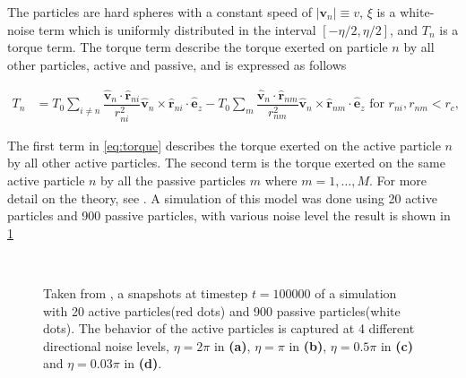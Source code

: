 The particles are hard spheres with a constant speed of $|\bm{v}_n|\equiv v$, $\xi$ is a white-noise 
term which is uniformly distributed in the interval $\left[-\eta/2, \eta/2\right]$, and $T_n$ is a 
torque term. The torque term describe the torque exerted on particle $n$ by all other particles, active 
and passive, and is expressed as follows

\begin{align}
    T_n &=  T_0\sum_{i\neq n}\dfrac{\bm{\hat{v}}_n\cdot\bm{\hat{r}}_{ni}}{r^2_{ni}}
            \bm{\hat{v}}_n\times\bm{\hat{r}}_{ni}\cdot\bm{\hat{e}}_z - 
            T_0\sum_{m}\dfrac{\bm{\hat{v}}_n\cdot\bm{\hat{r}}_{nm}}{r^2_{nm}}
            \bm{\hat{v}}_n\times\bm{\hat{r}}_{nm}\cdot\bm{\hat{e}}_z\text{ for } r_{ni}, r_{nm} < r_c,
            \label{eq:torque}
\end{align}

The first term in \cref{eq:torque} describes the torque exerted on the active particle $n$ by all other active particles. The second 
term is the torque exerted on the same active particle $n$ by all the passive particles $m$ where $m = 1,\ldots,M$.
For more detail on the theory, see \cite{nilsson2017metastable}. A simulation of this model was done using 20 active particles 
and 900 passive particles, with various noise level the result is shown in \cref{fig:simon_noise}

\begin{figure}[htbp]
\centering
\\

\caption{Taken from \cite{nilsson2017metastable}, a snapshots at timestep $t = \num{100000}$ of a 
simulation with 20 active particles(red dots) and 900 
passive particles(white dots). The behavior of the active particles is captured at 4 different directional 
noise levels, $\eta=2\pi$ in \textbf{(a)}, $\eta=\pi$ in \textbf{(b)}, $\eta=0.5\pi$ in \textbf{(c)} 
and $\eta=0.03\pi$ in \textbf{(d)}.} \label{fig:simon_noise}
\end{figure}

